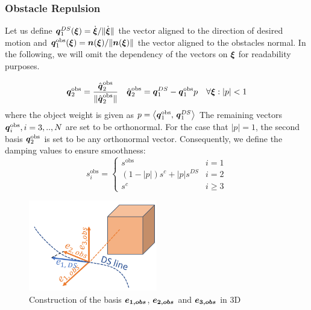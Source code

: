 \documentclass[conference]{IEEEtran}
\begin{document}
\subsubsection{Obstacle Repulsion}
Let us define $\boldsymbol{q}^{DS}_1 (\boldsymbol{\xi}) = \dot{\boldsymbol{\xi}} / \lVert \dot{\boldsymbol{\xi}}\rVert$ the vector aligned to the direction of desired motion and $\boldsymbol{q}_1^{\mathrm{obs}}(\boldsymbol{\xi}) =  \boldsymbol{n}(\boldsymbol{\xi}) / \lVert\boldsymbol{n}(\boldsymbol{\xi})\rVert$ the vector aligned to the obstacles normal.
In the following, we will omit the dependency of the vectors on $\boldsymbol{\xi}$ for readability purposes.

\begin{equation}
  \boldsymbol{q}_2^{\mathrm{obs}} = \frac{\hat{\boldsymbol{q}}_2^{\mathrm{obs}}}{\| \hat{\boldsymbol{q}}_2^{\mathrm{obs}} \|}
  \quad
  \hat{\boldsymbol{q}}_2^{\mathrm{obs}} = \boldsymbol{q}_1^{DS} - \boldsymbol{q}_1^{\mathrm{obs}} p \quad  \forall \boldsymbol{\xi} : | p | < 1
\end{equation}
where the object weight is given as $p = \left\langle {\boldsymbol{q}_1^{\mathrm{obs}}}, \, {\boldsymbol{q}_1^{DS}} \right\rangle$
The remaining vectors $\boldsymbol{q}_i^{\mathrm{obs}}, i = 3, .., N$ are set to be orthonormal. For the case that $| p | = 1$, the second basis $\boldsymbol{q}_2^{\mathrm{obs}}$ is set to be any orthonormal vector. 
Consequently, we define the damping values to ensure smoothness:
\begin{equation}
  s_i^{\mathrm{obs}} =
  \begin{cases}
    s^{\mathrm{obs}} & i = 1 \\
    (1 -  | p | ) s^c + | p | s^{DS} & i = 2 \\
    s^c & i \geq 3 
  \end{cases}
\end{equation}

\begin{figure}
\centerline{\includegraphics[width=0.5\textwidth]{figures/fig_basis_3D_DS_obs.png}}
\caption{Construction of the basis $\boldsymbol{e_{1,obs}}$, $\boldsymbol{e_{2,obs}}$ and $\boldsymbol{e_{3,obs}}$ in 3D}
\label{fig_basis_3D_DS_obs}
\end{figure}
\end{document}
